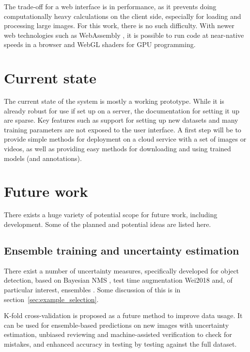 The trade-off for a web interface is in performance, as it prevents doing computationally heavy calculations on the client side, especially for loading and processing large images. For this work, there is no such difficulty. With newer web technologies such as WebAssembly \cite{Haas2017}, it is possible to run code at near-native speeds in a browser and WebGL shaders for GPU programming.

\section{Current state}
\label{sec:current_state}

The current state of the system is mostly a working prototype. While it is already robust for use if set up on a server, the documentation for setting it up are sparse.  Key features such as support for setting up new datasets and many training parameters are not exposed to the user interface. A first step will be to provide simple methods for deployment on a cloud service with a set of images or videos, as well as providing easy methods for downloading and using trained models (and annotations).


\section{Future work}
\label{sec:design_future_work}

There exists a huge variety of potential scope for future work, including development. Some of the planned and potential ideas are listed here.

\subsection{Ensemble training and uncertainty estimation}

There exist a number of uncertainty measures, specifically developed for object detection, based on Bayesian \gls{NMS} \cite{Harakeh}, test time augmentation {Wei2018} and, of particular interest, ensembles \cite{Le2018}. Some discussion of this is in section~\ref{sec:example_selection}. 

K-fold cross-validation is proposed as a future method to improve data usage. It can be used for ensemble-based predictions on new images with uncertainty estimation, unbiased reviewing and machine-assisted verification to check for mistakes, and enhanced accuracy in testing by testing against the full dataset.

